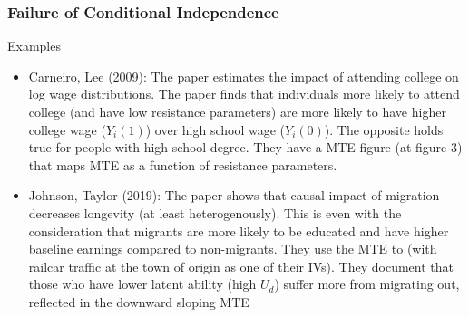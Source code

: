 \documentclass{beamer}
\begin{document}
\begin{frame}
\frametitle{Failure of Conditional Independence}
Examples 
\begin{itemize}
\item Carneiro, Lee (2009): The paper estimates the impact of attending college on log wage distributions. The paper finds that individuals more likely to attend college (and have low resistance parameters) are more likely to have higher college wage ($Y_i(1)$) over high school wage ($Y_i(0)$). The opposite holds true for people with high school degree. They have a MTE figure (at figure 3) that maps MTE as a function of resistance parameters.
\item Johnson, Taylor (2019): The paper shows that causal impact of migration decreases longevity (at least heterogenously). This is even with the consideration that migrants are more likely to be educated and have higher baseline earnings compared to non-migrants. They use the MTE to (with railcar traffic at the town of origin as one of their IVs). They document that those who have lower latent ability (high $U_d$) suffer more from migrating out, reflected in the downward sloping MTE 
\end{itemize}
\end{frame}
\end{document}
